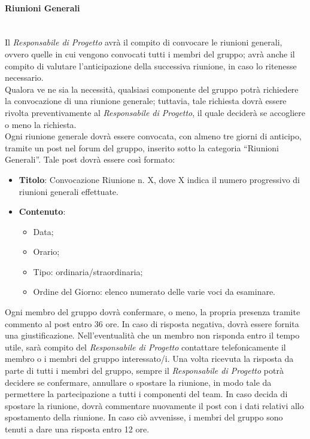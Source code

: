 \paragraph{Riunioni Generali}\mbox{}\\
Il \textit{Responsabile di Progetto} avrà il compito di convocare le riunioni generali, ovvero quelle in cui vengono convocati tutti i membri del gruppo; avrà anche il compito di valutare l'anticipazione della successiva riunione, in caso lo ritenesse necessario. \\
Qualora ve ne sia la necessità, qualsiasi componente del gruppo potrà richiedere la convocazione di una riunione generale; tuttavia, tale richiesta dovrà essere rivolta preventivamente al \textit{Responsabile di Progetto}, il quale deciderà se accogliere o meno la richiesta. \\
Ogni riunione generale dovrà essere convocata, con almeno tre giorni di anticipo, tramite un post nel forum del gruppo, inserito sotto la categoria “Riunioni Generali”.
Tale post dovrà essere così formato:
\begin{itemize}
\item \textbf{Titolo}: Convocazione Riunione n. X, dove X indica il numero progressivo di riunioni generali effettuate.
\item \textbf{Contenuto}: 
\begin{itemize}
\item Data;
\item Orario;
\item Tipo: ordinaria/straordinaria;
\item Ordine del Giorno: elenco numerato delle varie voci da esaminare.
\end{itemize}
\end{itemize}
Ogni membro del gruppo dovrà confermare, o meno, la propria presenza tramite commento al post entro 36 ore. In caso di risposta negativa, dovrà essere fornita una giustificazione. Nell'eventualità che un membro non risponda entro il tempo utile, sarà compito del \textit{Responsabile di Progetto} contattare telefonicamente il membro o i membri del gruppo interessato/i. Una volta ricevuta la risposta da parte di tutti i membri del gruppo, sempre il \textit{Responsabile di Progetto} potrà decidere se confermare, annullare o spostare la riunione, in modo tale da permettere la partecipazione a tutti i componenti del team. In caso decida di spostare la riunione, dovrà commentare nuovamente il post con i dati relativi allo spostamento della riunione. In caso ciò avvenisse, i membri del gruppo sono tenuti a dare una risposta entro 12 ore.

